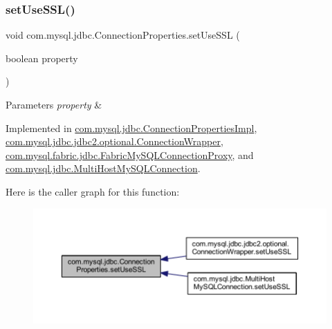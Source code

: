 \subsubsection{\texorpdfstring{set\+Use\+S\+S\+L()}{setUseSSL()}}
{\footnotesize\ttfamily void com.\+mysql.\+jdbc.\+Connection\+Properties.\+set\+Use\+S\+SL (\begin{DoxyParamCaption}\item[{boolean}]{property }\end{DoxyParamCaption})}


\begin{DoxyParams}{Parameters}
{\em property} & \\
\hline
\end{DoxyParams}


Implemented in \mbox{\hyperlink{classcom_1_1mysql_1_1jdbc_1_1_connection_properties_impl_aba2cc91a3bc602fe6cdf445d9c9c5166}{com.\+mysql.\+jdbc.\+Connection\+Properties\+Impl}}, \mbox{\hyperlink{classcom_1_1mysql_1_1jdbc_1_1jdbc2_1_1optional_1_1_connection_wrapper_afe754fe2674d4bbab1ba44cb09a81db6}{com.\+mysql.\+jdbc.\+jdbc2.\+optional.\+Connection\+Wrapper}}, \mbox{\hyperlink{classcom_1_1mysql_1_1fabric_1_1jdbc_1_1_fabric_my_s_q_l_connection_proxy_ab63698215bbf7fd19fa05fa618034f50}{com.\+mysql.\+fabric.\+jdbc.\+Fabric\+My\+S\+Q\+L\+Connection\+Proxy}}, and \mbox{\hyperlink{classcom_1_1mysql_1_1jdbc_1_1_multi_host_my_s_q_l_connection_ae199aca42e23e5ce684e148fb051da71}{com.\+mysql.\+jdbc.\+Multi\+Host\+My\+S\+Q\+L\+Connection}}.

Here is the caller graph for this function\+:\nopagebreak
\begin{figure}[H]
\begin{center}
\leavevmode
\includegraphics[width=350pt]{interfacecom_1_1mysql_1_1jdbc_1_1_connection_properties_a34adc2d834bd1ce90f8c8e65498906bd_icgraph}
\end{center}
\end{figure}
\mbox{\label{interfacecom_1_1mysql_1_1jdbc_1_1_connection_properties_a34c1ecb9d6258a0289516696cf8537be}} 
